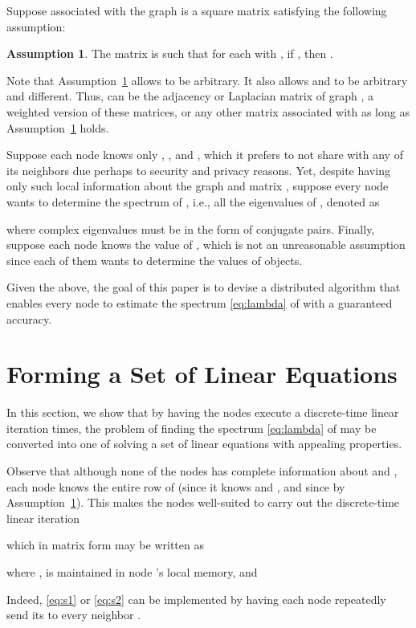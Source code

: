 \documentclass[11pt]{article}
\theoremstyle{plain}
\theoremstyle{definition}
\newtheorem{assumption}{Assumption}
\theoremstyle{remark}
\begin{document}
Suppose associated with the graph  is a square matrix  satisfying the following assumption:

\begin{assumption}\label{asm:W}
The matrix  is such that for each  with , if , then .
\end{assumption}

Note that Assumption~\ref{asm:W} allows   to be arbitrary. It also allows  and   to be arbitrary and different. Thus,  can be the adjacency or Laplacian matrix of graph , a weighted version of these matrices, or any other matrix associated with  as long as Assumption~\ref{asm:W} holds.

Suppose each node  knows only , , and  , which it prefers to not share with any of its neighbors due perhaps to security and privacy reasons. Yet, despite having only such local information about the graph  and matrix , suppose every node  wants to determine the spectrum of , i.e., all the  eigenvalues of , denoted as

where complex eigenvalues must be in the form of conjugate pairs. Finally, suppose each node  knows the value of , which is not an unreasonable assumption since each of them wants to determine the values of  objects.

Given the above, the goal of this paper is to devise a distributed algorithm that enables every node  to estimate the spectrum \eqref{eq:lambda} of  with a guaranteed accuracy.

\section{Forming a Set of Linear Equations}\label{sec:formlineequa}

In this section, we show that by having the nodes execute a discrete-time linear iteration  times, the problem of finding the spectrum \eqref{eq:lambda} of  may be converted into one of solving a set of linear equations with appealing properties.

Observe that although none of the nodes has complete information about  and , each node  knows the entire row  of  (since it knows  and  , and since   by Assumption~\ref{asm:W}). This makes the nodes well-suited to carry out the discrete-time linear iteration

which in matrix form may be written as

where ,  is maintained in node 's local memory, and

Indeed, \eqref{eq:s1} or \eqref{eq:s2} can be implemented by having each node  repeatedly send its  to every neighbor .
\end{document}

